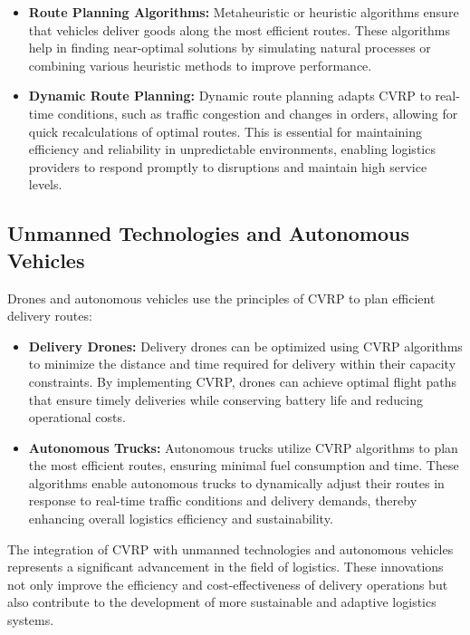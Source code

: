 \documentclass{article}
\begin{document}
    \begin{itemize}
        \item \textbf{Route Planning Algorithms:} Metaheuristic or heuristic algorithms ensure that vehicles deliver goods along the most efficient routes. These algorithms help in finding near-optimal solutions by simulating natural processes or combining various heuristic methods to improve performance. \cite{Ochelska2021}
        \item \textbf{Dynamic Route Planning:} Dynamic route planning adapts CVRP to real-time conditions, such as traffic congestion and changes in orders, allowing for quick recalculations of optimal routes. This is essential for maintaining efficiency and reliability in unpredictable environments, enabling logistics providers to respond promptly to disruptions and maintain high service levels. \cite{Patel2024}
    \end{itemize}

    \subsection{Unmanned Technologies and Autonomous Vehicles}\label{sec:unmanned-technologies-and-autonomous-vehicles}

    Drones and autonomous vehicles use the principles of CVRP to plan efficient delivery routes:

    \begin{itemize}
        \item \textbf{Delivery Drones:} Delivery drones can be optimized using CVRP algorithms to minimize the distance and time required for delivery within their capacity constraints. By implementing CVRP, drones can achieve optimal flight paths that ensure timely deliveries while conserving battery life and reducing operational costs. \cite{murray2015}
        \item \textbf{Autonomous Trucks:} Autonomous trucks utilize CVRP algorithms to plan the most efficient routes, ensuring minimal fuel consumption and time. These algorithms enable autonomous trucks to dynamically adjust their routes in response to real-time traffic conditions and delivery demands, thereby enhancing overall logistics efficiency and sustainability. \cite{toth2014vehicle}
    \end{itemize}

    The integration of CVRP with unmanned technologies and autonomous vehicles represents a significant advancement in the field of logistics. These innovations not only improve the efficiency and cost-effectiveness of delivery operations but also contribute to the development of more sustainable and adaptive logistics systems.
\end{document}
